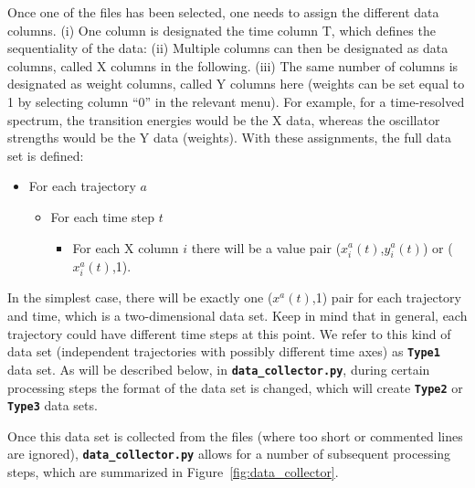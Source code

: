 \documentclass[a4paper,10pt,DIV=15,openany]{scrbook}
\newcommand{\ttt}[1]{\textbf{\texttt{#1}}}
\begin{document}
Once one of the files has been selected, one needs to assign the different data columns.
(i) One column is designated the time column T, which defines the sequentiality of the data:
(ii) Multiple columns can then be designated as data columns, called X columns in the following.
(iii) The same number of columns is designated as weight columns, called Y columns here (weights can be set equal to 1 by selecting column ``0'' in the relevant menu).
For example, for a time-resolved spectrum, the transition energies would be the X data, whereas the oscillator strengths would be the Y data (weights).
With these assignments, the full data set is defined:
\begin{itemize}
  \item For each trajectory $a$
  \begin{itemize}
    \item For each time step $t$
    \begin{itemize}
      \item For each X column $i$ there will be a value pair ($x^a_i(t)$,$y^a_i(t)$) or ($x^a_i(t)$,1).
    \end{itemize}
  \end{itemize}
\end{itemize}
In the simplest case, there will be exactly one ($x^a(t)$,1) pair for each trajectory and time, which is a two-dimensional data set.
Keep in mind that in general, each trajectory could have different time steps at this point.
We refer to this kind of data set (independent trajectories with possibly different time axes) as \ttt{Type1} data set.
As will be described below, in \ttt{data\_collector.py}, during certain processing steps the format of the data set is changed, which will create \ttt{Type2} or \ttt{Type3} data sets.

Once this data set is collected from the files (where too short or commented lines are ignored), \ttt{data\_collector.py} allows for a number of subsequent processing steps, which are summarized in Figure~\ref{fig:data_collector}.
\end{document}
